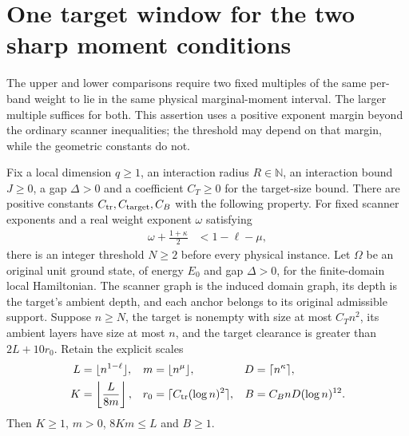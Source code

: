 \section{One target window for the two sharp moment conditions}
\label{sec:arealaw-target-sharp-moments}

The upper and lower comparisons require two fixed multiples of the same
per-band weight to lie in the same physical marginal-moment interval.
The larger multiple suffices for both.  This assertion uses a positive
exponent margin beyond the ordinary scanner inequalities; the threshold
may depend on that margin, while the geometric constants do not.

\begin{lemma}
    \label{thm:arealaw-target-sharp-moments}
    \leanok
    Fix a local dimension $q\geq1$, an interaction radius $R\in\mathbb N$,
    an interaction bound $J\geq0$, a gap $\Delta>0$ and a coefficient
    $C_T\geq0$ for the target-size bound.  There are positive constants
    $C_{\rm tr},C_{\rm target},C_B$ with the following property.
    For fixed scanner exponents and a real weight exponent $\omega$ satisfying
    \begin{align}
        \omega+\frac{1+\kappa}{2} & <1-\ell-\mu,
        \label{eq:arealaw-target-sharp-moment-margin}
    \end{align}
    there is an integer threshold $N\geq2$ before every physical instance.
    Let $\Omega$ be an original unit ground state, of energy $E_0$ and
    gap $\Delta>0$, for the finite-domain local Hamiltonian.  The scanner
    graph is the induced domain graph, its depth is the target's ambient
    depth, and each anchor belongs to its original admissible support.
    Suppose $n\geq N$, the target is nonempty with size at most $C_Tn^2$, its ambient
    layers have size at most $n$, and the target clearance is greater than
    $2L+10r_0$.  Retain the explicit scales
    \begin{align}
        L   & =\lfloor n^{1-\ell}\rfloor,             &
        m   & =\lfloor n^\mu\rfloor,                  &
        D   & =\lceil n^\kappa\rceil,\nonumber          \\
        K   & =\left\lfloor\frac{L}{8m}\right\rfloor, &
        r_0 & =\lceil C_{\rm tr}(\log n)^2\rceil,     &
        B   & =C_BnD(\log n)^{12}.
        \label{eq:arealaw-target-sharp-moment-scales}
    \end{align}
    Then $K\geq1$, $m>0$, $8Km\leq L$ and $B\geq1$.


\end{lemma}
